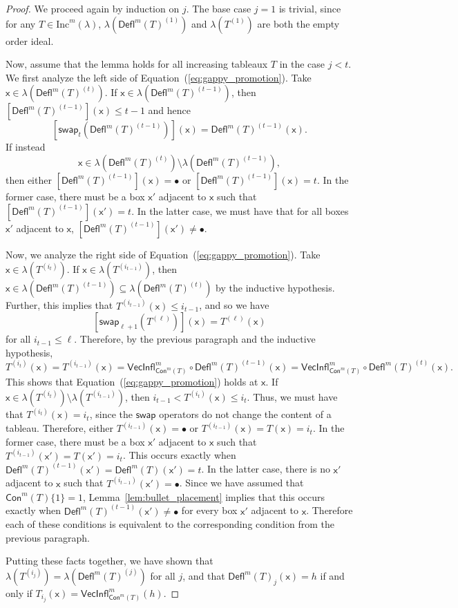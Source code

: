 \documentclass[12pt]{amsart}
\newcommand{\x}{\ensuremath{\mathsf{x}}}
\theoremstyle{definition}
\theoremstyle{remark}
\numberwithin{equation}{section}
\newcommand{\inc}{\ensuremath{\mathrm{Inc}}}
\newcommand{\swap}{\ensuremath{\mathsf{swap}}}
\newcommand{\deflate}{\ensuremath{\mathsf{Defl}}}
\newcommand{\inflate}{\ensuremath{\mathsf{VecInfl}}}
\newcommand{\content}{\ensuremath{\mathsf{Con}}}
\begin{document}
\begin{proof}  We proceed again by induction on $j$. The base case $j=1$ is trivial, since for any $T \in \inc^m(\lambda)$, $\lambda \left( \deflate^m(T)^{(1)} \right)$ and $\lambda \left( T^{(1)} \right)$ are both the empty order ideal.

Now, assume that the lemma holds for all increasing tableaux $T$ in the case $j < t$. We first analyze the left side of Equation~(\ref{eq:gappy_promotion}). Take $\x \in \lambda\left( \deflate^m(T)^{(t)} \right)$. If $\x \in \lambda\left( \deflate^m(T)^{(t-1)} \right)$, then 
$[\deflate^m(T)^{(t-1)}](\x) \leq t-1$ and hence
\[
\left[ \swap_{t}(\deflate^m(T)^{(t-1)})\right](\x) = \deflate^m(T)^{(t-1)}(\x).
\]
 If instead
 \[\x \in \lambda\left(\deflate^m(T)^{(t)}\right) \setminus \lambda\left(\deflate^m(T)^{(t-1)}\right),\]
  then either $[\deflate^m(T)^{(t-1)}](\x) = \bullet$ or $[\deflate^m(T)^{(t-1)}](\x) = t$. In the former case, there must be a box $\x'$ adjacent to $\x$ such that $[\deflate^m(T)^{(t-1)}](\x') = t$. In the latter case, we must have that for all boxes $\x'$ adjacent to $\x$, $[\deflate^m(T)^{(t-1)}](\x') \neq \bullet$. 

Now, we analyze the right side of Equation~(\ref{eq:gappy_promotion}). Take $\x \in \lambda\left( T^{(i_t)} \right)$.   If $\x \in \lambda \left(T^{(i_{t-1})} \right)$, then $\x \in \lambda(\deflate^m(T)^{(t-1)}) \subseteq \lambda(\deflate^m(T)^{(t)})$ by the inductive hypothesis. Further, this implies that $T^{(i_{t-1})}(\x) \leq i_{t-1}$,  and so we have
\[
\left[ \swap_{\ell+1} \left(T^{(\ell)} \right) \right](\x) = T^{(\ell)}(\x)
\]
 for all $i_{t-1} \leq \ell$. Therefore, by the previous paragraph and the inductive hypothesis,
 \[ T^{(i_t)}(\x) = T^{(i_{t-1})}(\x) = \inflate^m_{\content^m(T)} \circ \deflate^m(T)^{(t-1)}(\x) =  \inflate^m_{\content^m(T)} \circ \deflate^m(T)^{(t)}(\x). \] This shows that Equation~(\ref{eq:gappy_promotion}) holds at $\x$. If $\x \in \lambda \left(T^{(i_{t})} \right) \setminus \lambda \left(T^{(i_{t-1})} \right)$, then $i_{t-1} < T^{(i_{t})}(\x) \leq i_t$. Thus, we must have that $T^{(i_{t})}(\x) = i_{t}$, since the $\swap$ operators do not change the content of a tableau. Therefore, either $T^{(i_{t-1})}(\x) = \bullet$ or $T^{(i_{t-1})}(\x) =  T(\x) = i_{t}$. In the former case, there must be a box $\x'$ adjacent to $\x$ such that $T^{(i_{t-1})}(\x') = T(\x') = i_{t}$. This occurs exactly when $\deflate^m(T)^{(t-1)}(\x') = \deflate^m(T)(\x') = t$. In the latter case, there is no $\x'$ adjacent to $\x$ such that $T^{(i_{t-1})}(\x') = \bullet$. Since we have assumed that  $\content^m(T) \lbrace 1 \rbrace = 1$, Lemma~\ref{lem:bullet_placement} implies that this occurs exactly when  $\deflate^m(T)^{(t-1)}(\x') \neq \bullet$ for every box $\x'$ adjacent to $\x$. Therefore each of these conditions is equivalent to the corresponding condition from the previous paragraph. 
 
Putting these facts together, we have shown that $\lambda \left(T^{(i_j)} \right) = \lambda \left(\deflate^m(T)^{(j)} \right)$ for all $j$, and that $\deflate^m(T)_j(\x) = h$ if and only if $T_{i_j}(\x) = \inflate^m_{\content^m(T)}(h)$. 
\end{proof}
\end{document}
